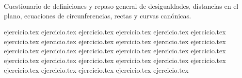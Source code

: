 
Cuestionario de definiciones y repaso general de desigualdades, distancias en el plano, ecuaciones de circunferencias, rectas y curvas canónicas.

\begin{enumerate}
    {ejercicio.tex}
    {ejercicio.tex}
    {ejercicio.tex}
    {ejercicio.tex}
    {ejercicio.tex}
    {ejercicio.tex}
    \setcounter{enumi}{6}
    {ejercicio.tex}
    {ejercicio.tex}
    {ejercicio.tex}
    {ejercicio.tex}
    {ejercicio.tex}
    \setcounter{enumi}{11}
    {ejercicio.tex}
    {ejercicio.tex}
    {ejercicio.tex}
    {ejercicio.tex}
    {ejercicio.tex}
    {ejercicio.tex}
    {ejercicio.tex}
    \setcounter{enumi}{18}
    {ejercicio.tex}
    {ejercicio.tex}
    {ejercicio.tex}
    {ejercicio.tex}
    {ejercicio.tex}
    {ejercicio.tex}
    \setcounter{enumi}{24}
    {ejercicio.tex}
    {ejercicio.tex}
    {ejercicio.tex}
    {ejercicio.tex}
    {ejercicio.tex}
\end{enumerate}
